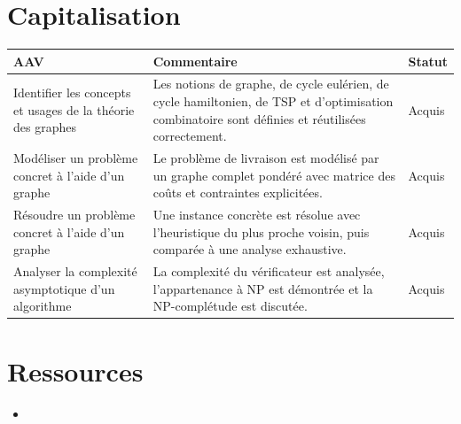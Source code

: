\section*{Capitalisation}

\begin{center}
\setlength{\tabcolsep}{10pt}

\begin{tabular}{|p{}|p{}|m{}|}
\hline
\textbf{AAV} & \textbf{Commentaire} & \textbf{Statut} \\ \hline

Identifier les concepts et usages de la théorie des graphes &
Les notions de graphe, de cycle eulérien, de cycle hamiltonien, de TSP et d'optimisation combinatoire sont définies et réutilisées correctement. &
{\color{green!60!black}Acquis} \\ \hline

Modéliser un problème concret à l’aide d’un graphe &
Le problème de livraison est modélisé par un graphe complet pondéré avec matrice des coûts et contraintes explicitées. &
{\color{green!60!black}Acquis} \\ \hline

Résoudre un problème concret à l’aide d’un graphe &
Une instance concrète est résolue avec l’heuristique du plus proche voisin, puis comparée à une analyse exhaustive. &
{\color{green!60!black}Acquis} \\ \hline

Analyser la complexité asymptotique d'un algorithme &
La complexité du vérificateur est analysée, l’appartenance à NP est démontrée et la NP-complétude est discutée. &
{\color{green!60!black}Acquis} \\ \hline

\end{tabular}

\end{center}

\newpage

\section*{Ressources}

\begin{itemize}
	\item 
\end{itemize}
